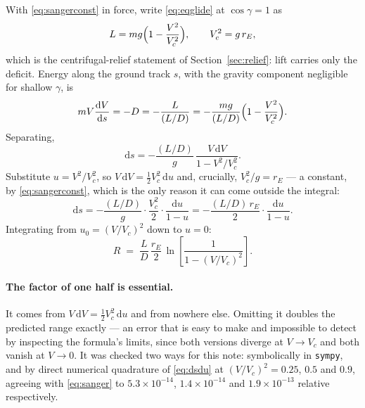 \documentclass[11pt]{article}
\newcommand{\code}[1]{\texttt{#1}}
\newcommand{\dd}{\mathrm{d}}
\begin{document}
With \eqref{eq:sangerconst} in force, write \eqref{eq:eqglide} at
$\cos\gamma = 1$ as
\begin{equation}
  L = mg\Bigl(1 - \frac{V^2}{V_c^2}\Bigr), \qquad V_c^2 = g\,r_E ,
  \label{eq:liftdeficit}
\end{equation}
which is the centrifugal-relief statement of Section~\ref{sec:relief}: lift
carries only the deficit. Energy along the ground track $s$, with the gravity
component negligible for shallow $\gamma$, is
\begin{equation}
  m V \frac{\dd V}{\dd s} = -D = -\frac{L}{(L/D)}
  = -\frac{mg}{(L/D)}\Bigl(1 - \frac{V^2}{V_c^2}\Bigr) .
\end{equation}
Separating,
\begin{equation}
  \dd s = -\frac{(L/D)}{g}\,\frac{V\,\dd V}{1 - V^2/V_c^2} .
\end{equation}
Substitute $u = V^2/V_c^2$, so $V\,\dd V = \tfrac12 V_c^2\,\dd u$ and,
crucially, $V_c^2/g = r_E$ --- a constant, by \eqref{eq:sangerconst}, which is
the only reason it can come outside the integral:
\begin{equation}
  \dd s = -\frac{(L/D)}{g}\cdot\frac{V_c^2}{2}\cdot\frac{\dd u}{1-u}
        = -\frac{(L/D)\,r_E}{2}\cdot\frac{\dd u}{1-u} .
  \label{eq:dsdu}
\end{equation}
Integrating from $u_0 = (V/V_c)^2$ down to $u=0$:
\begin{equation}
  R \;=\; \frac{L}{D}\,\frac{r_E}{2}\,
          \ln\!\left[\frac{1}{1 - (V/V_c)^2}\right].
  \label{eq:sanger}
\end{equation}

\paragraph{The factor of one half is essential.} It comes from
$V\,\dd V = \tfrac12 V_c^2\,\dd u$ and from nowhere else. Omitting it doubles
the predicted range exactly --- an error that is easy to make and impossible to
detect by inspecting the formula's limits, since both versions diverge at
$V\to V_c$ and both vanish at $V\to 0$. It was checked two ways for this note:
symbolically in \code{sympy}, and by direct numerical quadrature of
\eqref{eq:dsdu} at $(V/V_c)^2 = 0.25$, $0.5$ and $0.9$, agreeing with
\eqref{eq:sanger} to $5.3\times10^{-14}$, $1.4\times10^{-14}$ and
$1.9\times10^{-13}$ relative respectively.
\end{document}
